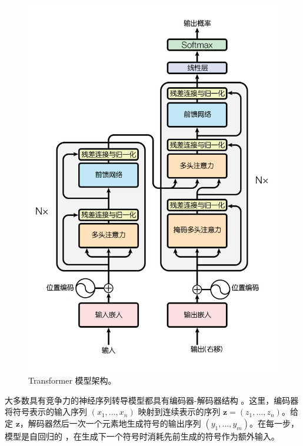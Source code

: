 \begin{figure}
  \centering
  \includegraphics[scale=0.6]{Figures/ModalNet-21}
  \caption{Transformer 模型架构。}
  \label{fig:model-arch}
\end{figure}


大多数具有竞争力的神经序列转导模型都具有编码器-解码器结构 \citep{cho2014learning,bahdanau2014neural,sutskever14}。这里，编码器将符号表示的输入序列 $(x_1, ..., x_n)$ 映射到连续表示的序列 $\mathbf{z} = (z_1, ..., z_n)$。给定 $\mathbf{z}$，解码器然后一次一个元素地生成符号的输出序列 $(y_1,...,y_m)$。在每一步，模型是自回归的 \citep{graves2013generating}，在生成下一个符号时消耗先前生成的符号作为额外输入。

